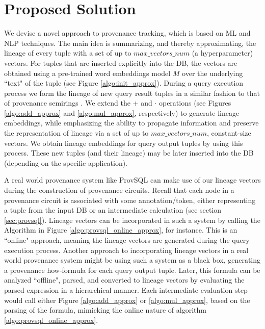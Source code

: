 \section{Proposed Solution}\label{sec:proposed_solution_approx}
\par We devise a novel approach to provenance tracking, which is based on ML and NLP techniques. The main idea is summarizing, and thereby approximating, the lineage of every tuple with a set of up to $max\_vectors\_num$ (a hyperparameter) vectors. For tuples that are inserted explicitly into the DB, the vectors are obtained using a pre-trained word embeddings model $M$ over the underlying ``text" of the tuple (see Figure \ref{algo:init_approx}).
During a query execution process we form the lineage of new query result tuples in a similar fashion to that of provenance semirings \cite{green2007provenance}. We extend the + and $\cdot$ operations (see Figures \ref{algo:add_approx} and
\ref{algo:mul_approx}, respectively) to generate lineage embeddings, while emphasizing the ability to propagate information and preserve the representation of lineage via a set of up to $max\_vectors\_num$, constant-size vectors. We obtain lineage embeddings for query output tuples by using this process. These new tuples (and their lineage) may be later inserted into the DB (depending on the specific application). 
\par A real world provenance system like ProvSQL \cite{provsql_github} can make use of our lineage vectors during the construction of provenance circuits. Recall that each node in a provenance circuit is associated with some annotation/token, either representing a tuple from the input DB or an intermediate calculation (see section \ref{sec:provsql}). Lineage vectors can be incorporated in such a system by calling the Algorithm in Figure \ref{algo:provsql_online_approx}, for instance. This is an ``online" approach, meaning the lineage vectors are generated during the query execution process. Another approach to incorporating lineage vectors in a real world provenance system might be using such a system as a black box, generating a provenance how-formula for each query output tuple. Later, this formula can be analyzed ``offline", parsed, and converted to lineage vectors by evaluating the parsed expression in a hierarchical manner. Each intermediate evaluation step would call either Figure \ref{algo:add_approx} or \ref{algo:mul_approx}, based on the parsing of the formula, mimicking the online nature of algorithm \ref{algo:provsql_online_approx}.


